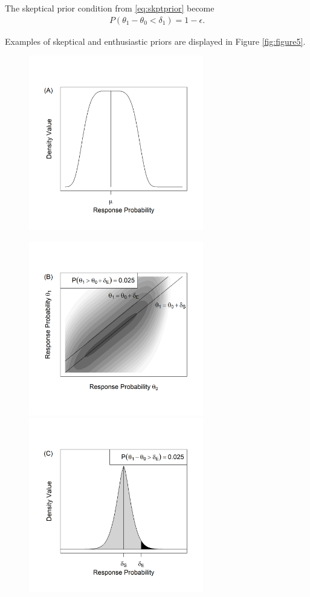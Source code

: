 \documentclass[12pt]{article}
\begin{document}
The skeptical prior condition from \eqref{eq:skptprior} become
\begin{align}\label{eq:ex2skptcondition}
P(\theta_1-\theta_0<\delta_1)=1-\epsilon.
\end{align}


Examples of skeptical and enthusiastic priors are displayed in Figure \ref{fig:figure5}.

\begin{figure}\begin{center}
\includegraphics[width=3in]{./FIGURES/figure5c.png}

\includegraphics[width=3in]{./FIGURES/figure5a.png}
\includegraphics[width=3in]{./FIGURES/figure5d.png}


\end{center}
\end{figure}
\end{document}
